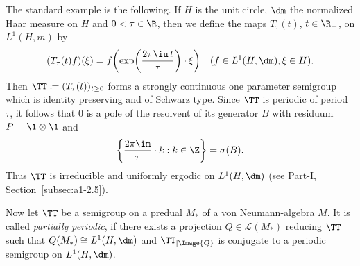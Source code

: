 The standard example is the following.
If\/ $ H $  is the unit circle, $ \dm $  the normalized Haar measure on $ H $  and $ 0 < \tau \in \R $, then we define the maps $ T_{\tau}(t) $, $ t \in \R_{+} $, on $ L^{1}(H,m) $  by
\[
(T_{\tau}(t)f)(\xi) = f\mleft( \exp\mleft(\frac{2\pi \iu  \, t }{\tau} \mright) \cdot \xi \mright) \quad (f \in L^{1}(H,\dm), \xi \in H).
\]
%
%
Then $ \TT \coloneqq (T_{\tau}(t))_{t \geq 0} $  forms a strongly continuous one parameter semigroup which is identity preserving and of Schwarz type.
Since $ \TT $  is periodic of period $ \tau $, it follows that 0 is a pole of the resolvent of its generator $ B $  with residuum $ P = \1 \otimes \1 $  and %
\[
	\left\{\frac{2\pi \im}{\tau} \cdot k: k \in \Z \right\} = \sigma(B) .
\]
%
Thus $ \TT $  is irreducible and uniformly ergodic on $ L^{1}(H,\dm) $  
(see Part-I, Section~\ref{subsec:a1-2.5}).

Now let $ \TT $  be a semigroup on a predual $ M_{*} $ of a von Neumann-algebra $ M $.
It is called \emph{partially periodic}, if there exists a projection $ Q \in \mathcal{L}(M_{*}) $  reducing $ \TT $  such that $ Q(M_{*}) \cong L^{1}(H,\dm) $  and $ \TT_{| \Image{Q}} $  is conjugate to a periodic semigroup on $ L^{1}(H,\dm) $.

